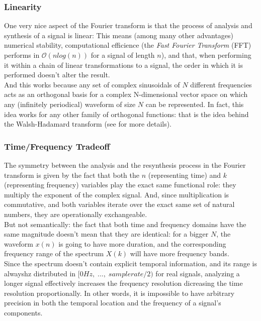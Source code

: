 \subsubsection{Linearity}


One very nice aspect of the Fourier transform is that the process of analysis and synthesis of a signal is linear\cite[p.148]{musimathics}: This means (among many other advantages) numerical stability, computational efficience (the {\it Fast Fourier Transform} (FFT) performs in \(\mathcal{O}(n log(n))\) for a signal of length \(n\)), and that, when performing it within a chain of linear transformations to a signal, the order in which it is performed doesn't alter the result.\\

And this works because any set of complex sinusoidals of \(N\) different frequencies acts as an orthogonal basis for a complex N-dimensional vector space on which any (infinitely periodical) waveform of size \(N\) can be represented. In fact, this idea works for any other family of orthogonal functions: that is the idea behind the Walsh-Hadamard transform (see \cite[p.525]{musimathics} for more details).

\subsubsection{Time/Frequency Tradeoff}

The symmetry between the analysis and the resynthesis process in the Fourier transform is given by the fact that both the \(n\) (representing time) and \(k\) (representing frequency) variables play the exact same functional role: they multiply the exponent of the complex signal. And, since multiplication is commutative, and both variables iterate over the exact same set of natural numbers, they are operationally exchangeable.\\

But not semantically: the fact that both time and frequency domains have the same magnitude doesn't mean that they are identical: for a bigger \(N\), the waveform \(x(n)\) is going to have more duration, and the corresponding frequency range of the spectrum \(X(k)\) will have more frequency bands.\\

Since the spectrum doesn't contain explicit temporal information, and its range is alwayshz distributed in \([0Hz,\; ..., \; samplerate/2)\) for real signals, analyzing a longer signal effectively increases the frequency resolution dicreasing the time resolution proportionally. In other words, it is impossible to have arbitrary precision in both the temporal location and the frequency of a signal's components.\\

